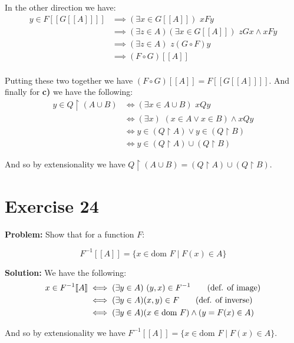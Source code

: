 \documentclass{article}
\begin{document}
In the other direction we have:
\begin{align*}
    y\in F[\![G[\![A]\!]]\!]&\implies (\exists x\in G[\![A]\!])\,\,xFy\tag{def. of image}\\
    &\implies (\exists z\in A)(\exists x\in G[\![A]\!])\,\,zGx\wedge xFy\tag{def. of image}\\
    &\implies (\exists z\in A)\,\,z(G\circ F)y\tag{def. of composition}\\
    &\implies (F\circ G)[\![A]\!]\tag{def. of image}\\
\end{align*}

Putting these two together we have $(F\circ G)[\![A]\!]=F[\![G[\![A]\!]]\!]$. And finally for \textbf{c)} we have the following:
\begin{align*}
    y\in Q\upharpoonright(A\cup B)&\iff(\exists x\in A\cup B)\,\,xQy\tag{def. of restriction}\\
    &\iff(\exists x)\,\,(x\in A\vee x\in B)\wedge xQy\tag{def. of union}\\
    &\iff y\in(Q\upharpoonright A) \vee y\in(Q\upharpoonright B)\tag{def. of restriction}\\
    &\iff y\in(Q\upharpoonright A)\cup(Q\upharpoonright B)\tag{def. of union}
\end{align*}

And so by extensionality we have $Q\upharpoonright(A\cup B)=(Q\upharpoonright A)\cup(Q\upharpoonright B)$.

\section*{Exercise 24}
\noindent\textbf{Problem:} Show that for a function $F$:

\begin{equation*}
    F^{-1}[\![A]\!]=\{x\in\text{dom } F\mid F(x)\in A\}
\end{equation*} 

\noindent\textbf{Solution:} We have the following:
\begin{align*}
    x\in F^{-1}[\![A]\!]&\iff(\exists y\in A)\,\,(y,x)\in F^{-1}\tag{def. of image}\\
    &\iff(\exists y\in A)(x,y)\in F\tag{def. of inverse}\\
    &\iff(\exists y\in A)(x\in\text{dom } F)\wedge (y=F(x)\in A) 
\end{align*}

And so by extensionality we have $F^{-1}[\![A]\!]=\{x\in\text{dom } F\mid F(x)\in A\}$.
\end{document}

